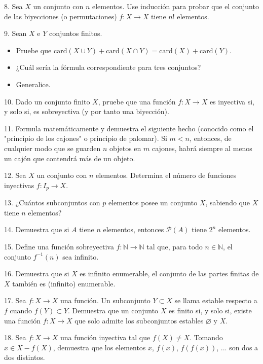 8. Sea \( X \) un conjunto con \( n \) elementos. Use inducción para probar que el conjunto de las biyecciones (o permutaciones) \( f: X \to X \) tiene \( n! \) elementos.

9. Sean \( X \) e \( Y \) conjuntos finitos.

\begin{itemize}
    \item[a)] Pruebe que \( \text{card}(X \cup Y) + \text{card}(X \cap Y) = \text{card}(X) + \text{card}(Y) \).
    \item[b)] ¿Cuál sería la fórmula correspondiente para tres conjuntos?
    \item[c)] Generalice.
\end{itemize}

10. Dado un conjunto finito \( X \), pruebe que una función \( f: X \to X \) es inyectiva si, y solo si, es sobreyectiva (y por tanto una biyección).

11. Formula matemáticamente y demuestra el siguiente hecho (conocido como el "principio de los cajones" o principio de palomar). Si \(m < n\), entonces, de cualquier modo que se guarden \(n\) objetos en \(m\) cajones, habrá siempre al menos un cajón que contendrá más de un objeto.

12. Sea \(X\) un conjunto con \(n\) elementos. Determina el número de funciones inyectivas \(f: I_p \to X\).

13. ¿Cuántos subconjuntos con \(p\) elementos posee un conjunto \(X\), sabiendo que \(X\) tiene \(n\) elementos?

14. Demuestra que si \(A\) tiene \(n\) elementos, entonces \(\mathcal{P}(A)\) tiene \(2^n\) elementos.

15. Define una función sobreyectiva \(f: \mathbb{N} \to \mathbb{N}\) tal que, para todo \(n \in \mathbb{N}\), el conjunto \(f^{-1}(n)\) sea infinito.

16. Demuestra que si \(X\) es infinito enumerable, el conjunto de las partes finitas de \(X\) también es (infinito) enumerable.

17. Sea \(f: X \to X\) una función. Un subconjunto \(Y \subset X\) se llama estable respecto a \(f\) cuando \(f(Y) \subset Y\). Demuestra que un conjunto \(X\) es finito si, y solo si, existe una función \(f: X \to X\) que solo admite los subconjuntos estables \(\varnothing\) y \(X\).

18. Sea \(f: X \to X\) una función inyectiva tal que \(f(X) \neq X\). Tomando \(x \in X - f(X)\), demuestra que los elementos \(x\), \(f(x)\), \(f(f(x))\), ... son dos a dos distintos.

